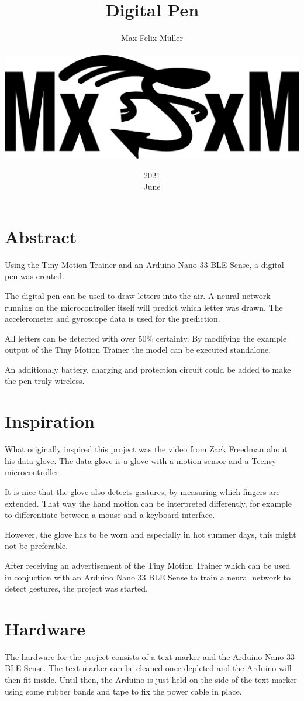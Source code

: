 \documentclass[a4paper,titlepage]{article}
\title{Digital Pen}
\date{2021\\ June}
\author{Max-Felix Müller\\ \\ \includegraphics[width=\textwidth]{mxfxm.png}}
\begin{document}
\maketitle
\tableofcontents
\newpage
\listoffigures %
\listoftables %
\newpage

\section*{Abstract}

Using the Tiny Motion Trainer and an Arduino Nano 33 BLE Sense, a digital pen was created.

The digital pen can be used to draw letters into the air.
A neural network running on the microcontroller itself will predict which letter was drawn.
The accelerometer and gyroscope data is used for the prediction.

All letters can be detected with over 50\% certainty.
By modifying the example output of the Tiny Motion Trainer the model can be executed standalone.

An additionaly battery, charging and protection circuit could be added to make the pen truly wireless.

\newpage
\section{Inspiration}

What originally inspired this project was the video from Zack Freedman about his data glove.
The data glove is a glove with a motion sensor and a Teensy microcontroller.

It is nice that the glove also detects gestures, by measuring which fingers are extended.
That way the hand motion can be interpreted differently, for example to differentiate between a mouse and a keyboard interface.

However, the glove has to be worn and especially in hot summer days, this might not be preferable.

After receiving an advertisement of the Tiny Motion Trainer which can be used in conjuction with an Arduino Nano 33 BLE Sense to train a neural network to detect gestures, the project was started.

\section{Hardware}

The hardware for the project consists of a text marker and the Arduino Nano 33 BLE Sense.
The text marker can be cleaned once depleted and the Arduino will then fit inside.
Until then, the Arduino is just held on the side of the text marker using some rubber bands and tape to fix the power cable in place.
\end{document}

